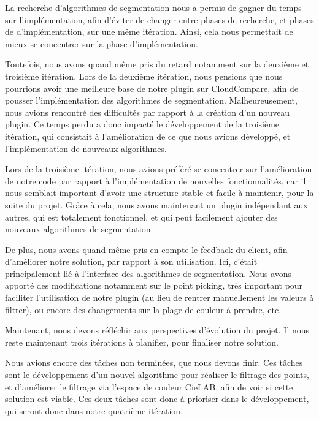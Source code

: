 \documentclass[12pt,titlepage,french]{article}
\begin{document}
La recherche d'algorithmes de segmentation nous a permis de gagner du temps sur l'implémentation, afin d'éviter de changer entre phases de recherche, et phases de d'implémentation, sur une même itération. Ainsi, cela nous permettait de mieux se concentrer sur la phase d'implémentation. 

Toutefois, nous avons quand même pris du retard notamment sur la deuxième et troisième itération. Lors de la deuxième itération, nous pensions que nous pourrions avoir une meilleure base de notre plugin sur CloudCompare, afin de pousser l'implémentation des algorithmes de segmentation. Malheureusement, nous avions rencontré des difficultés par rapport à la création d'un nouveau plugin. Ce temps perdu a donc impacté le développement de la troisième itération, qui consistait à l'amélioration de ce que nous avions développé, et l'implémentation de nouveaux algorithmes.

Lors de la troisième itération, nous avions préféré se concentrer sur l'amélioration de notre code par rapport à l'implémentation de nouvelles fonctionnalités, car il nous semblait important d'avoir une structure stable et facile à maintenir, pour la suite du projet. Grâce à cela, nous avons maintenant un plugin indépendant aux autres, qui est totalement fonctionnel, et qui peut facilement ajouter des nouveaux algorithmes de segmentation. 

De plus, nous avons quand même pris en compte le feedback du client, afin d'améliorer notre solution, par rapport à son utilisation. Ici, c'était principalement lié à l'interface des algorithmes de segmentation. Nous avons apporté des modifications notamment sur le point picking, très important pour faciliter l'utilisation de notre plugin (au lieu de rentrer manuellement les valeurs à filtrer), ou encore des changements sur la plage de couleur à prendre, etc. \newline

Maintenant, nous devons réfléchir aux perspectives d'évolution du projet. Il nous reste maintenant trois itérations à planifier, pour finaliser notre solution. \newline

Nous avions encore des tâches non terminées, que nous devons finir. Ces tâches sont le développement d'un nouvel algorithme pour réaliser le filtrage des points, et d'améliorer le filtrage via l'espace de couleur CieLAB, afin de voir si cette solution est viable. Ces deux tâches sont donc à prioriser dans le développement, qui seront donc dans notre quatrième itération.
\end{document}
